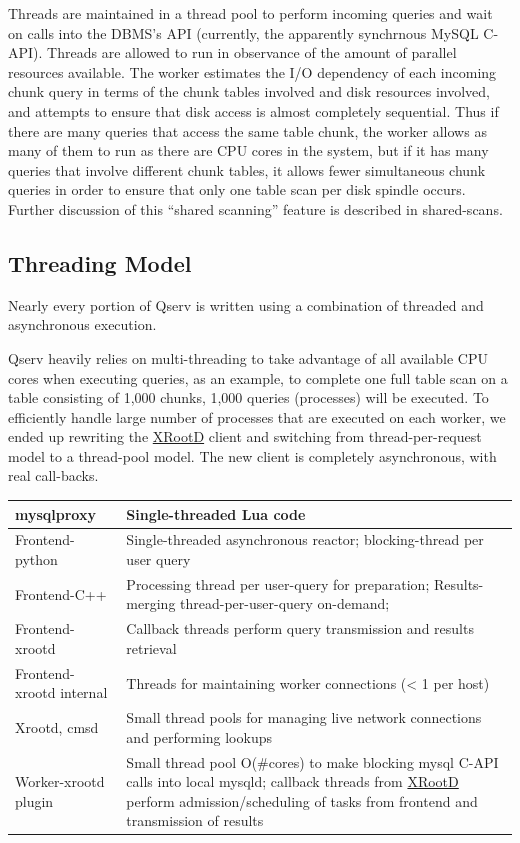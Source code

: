 \documentclass[DM,lsstdraft,toc]{lsstdoc}
\begin{document}
Threads are maintained in a thread pool to perform incoming queries and
wait on calls into the DBMS's API (currently, the apparently synchrnous
MySQL C-API). Threads are allowed to run in observance of the amount of
parallel resources available. The worker estimates the I/O dependency of
each incoming chunk query in terms of the chunk tables involved and disk
resources involved, and attempts to ensure that disk access is almost
completely sequential. Thus if there are many queries that access the
same table chunk, the worker allows as many of them to run as there are
CPU cores in the system, but if it has many queries that involve
different chunk tables, it allows fewer simultaneous chunk queries in
order to ensure that only one table scan per disk spindle occurs.
Further discussion of this ``shared scanning'' feature is described in
shared-scans.

\subsection{Threading Model}\label{threading-model}

Nearly every portion of Qserv is written using a combination of threaded
and asynchronous execution.

Qserv heavily relies on multi-threading to take advantage of all
available CPU cores when executing queries, as an example, to complete
one full table scan on a table consisting of 1,000 chunks, 1,000 queries
(processes) will be executed. To efficiently handle large number of
processes that are executed on each worker, we ended up rewriting the
\href{http://xrootd.org}{XRootD} client and switching from
thread-per-request model to a thread-pool model. The new client is
completely asynchronous, with real call-backs.

\begin{longtable}{|l|p{}|}
\hline
mysqlproxy & Single-threaded Lua code \\ \hline
Frontend-python & Single-threaded asynchronous reactor; blocking-thread per user
query \\ \hline
Frontend-C++ & Processing thread per user-query for preparation; Results-merging
thread-per-user-query on-demand; \\ \hline
Frontend-xrootd &
Callback threads perform query transmission and results retrieval \\ \hline
Frontend-xrootd internal &
Threads for maintaining worker connections (\textless{} 1 per
host) \\ \hline
Xrootd, cmsd &
Small thread pools for managing live network connections and performing
lookups \\ \hline
Worker-xrootd plugin &
Small thread pool O(\#cores) to make blocking mysql C-API calls into
local mysqld; callback threads from \href{http://xrootd.org}{XRootD}
perform admission/scheduling of tasks from frontend and transmission of
results \\ \hline
\hline
\end{longtable}
\end{document}
